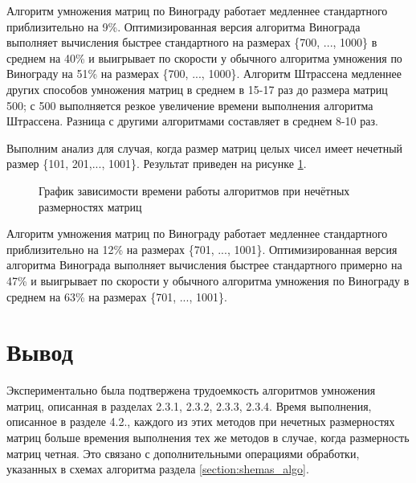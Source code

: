Алгоритм умножения матриц по Винограду работает медленнее стандартного приблизительно на 9\%. Оптимизированная версия алгоритма Винограда выполняет вычисления быстрее стандартного на размерах \{700, ..., 1000\} в среднем на 40\% и выигрывает по скорости у обычного алгоритма умножения по Винограду на 51\% на размерах \{700, ..., 1000\}. Алгоритм Штрассена медленнее других способов умножения матриц в среднем в 15-17 раз до размера матриц 500; с 500 выполняется резкое увеличение времени выполнения алгоритма Штрассена. Разница с другими алгоритмами составляет в среднем 8-10 раз.


Выполним анализ для случая, когда размер матриц целых чисел имеет нечетный размер \{101, 201,..., 1001\}. Результат приведен на рисунке \ref{fg:6_2}.
\begin{figure}[H]
	\centering
	\caption{График зависимости времени работы алгоритмов при нечётных размерностях матриц} 
	\label{fg:6_2}
\end{figure}
Алгоритм умножения матриц по Винограду работает медленнее стандартного приблизительно на 12\% на размерах \{701, ..., 1001\}. Оптимизированная версия алгоритма Винограда выполняет вычисления быстрее стандартного примерно на 47\% и выигрывает по скорости у обычного алгоритма умножения по Винограду в среднем на 63\% на размерах \{701, ..., 1001\}.


\section*{Вывод}
Экспериментально была подтвержена трудоемкость алгоритмов умножения матриц, описанная в разделах 2.3.1, 2.3.2, 2.3.3, 2.3.4. Время выполнения, описанное в разделе 4.2., каждого из этих методов при нечетных размерностях матриц больше времения выполнения тех же методов в случае, когда размерность матриц четная. Это связано с дополнительными операциями обработки, указанных в схемах алгоритма раздела \ref{section:shemas_algo}.